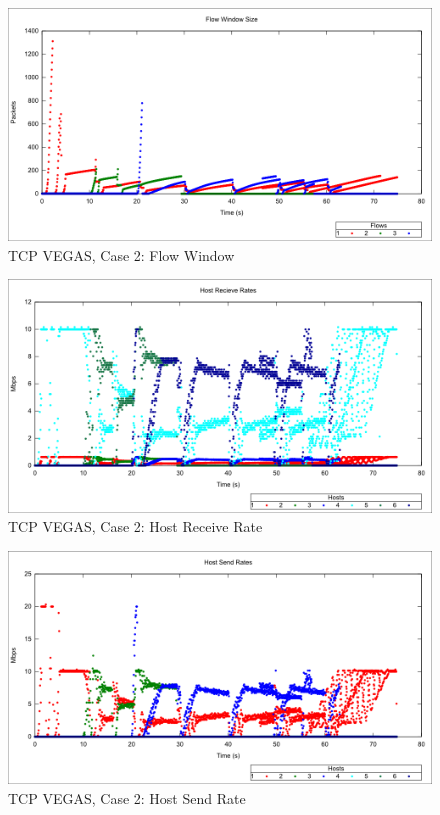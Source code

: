 \begin{figure}[htbp]
    \centering
    \includegraphics[width=\textwidth]{vegas2/Flow_Window.png}
    \caption{TCP VEGAS, Case 2: Flow Window}
\end{figure}

\begin{figure}[htbp]
    \centering
    \includegraphics[width=\textwidth]{vegas2/Host_Receive.png}
    \caption{TCP VEGAS, Case 2: Host Receive Rate}
\end{figure}


\begin{figure}[htbp]
    \centering
    \includegraphics[width=\textwidth]{vegas2/Host_Send.png}
    \caption{TCP VEGAS, Case 2: Host Send Rate}
\end{figure}

